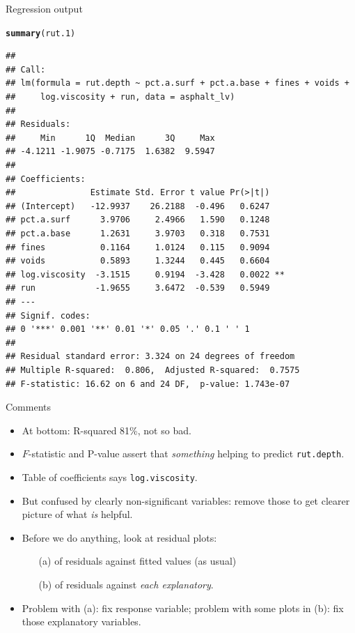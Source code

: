 \documentclass[unknownkeysallowed]{beamer}\usepackage[]{graphicx}\usepackage[]{color}
\makeatletter
\newcommand{\hlstd}[1]{\textcolor[rgb]{0.345,0.345,0.345}{#1}}%
\newcommand{\hlkwd}[1]{\textcolor[rgb]{0.737,0.353,0.396}{\textbf{#1}}}%
\newenvironment{kframe}{%
 \def\at@end@of@kframe{}%
 \ifinner\ifhmode%
  \def\at@end@of@kframe{\end{minipage}}%
  \begin{minipage}{\columnwidth}%
 \fi\fi%
 \def\FrameCommand##1{\hskip\@totalleftmargin \hskip-\fboxsep
 \colorbox{shadecolor}{##1}\hskip-\fboxsep
     \hskip-\linewidth \hskip-\@totalleftmargin \hskip\columnwidth}%
 \MakeFramed {\advance\hsize-\width
   \@totalleftmargin\z@ \linewidth\hsize
   \@setminipage}}%
 {\par\unskip\endMakeFramed%
 \at@end@of@kframe}
\newenvironment{knitrout}{}{} %
\makeatother
\begin{document}
\begin{frame}[fragile]{Regression output}

\begin{knitrout}\scriptsize
{}\color{fgcolor}\begin{kframe}
\begin{alltt}
\hlkwd{summary}\hlstd{(rut.1)}
\end{alltt}
\begin{verbatim}
## 
## Call:
## lm(formula = rut.depth ~ pct.a.surf + pct.a.base + fines + voids + 
##     log.viscosity + run, data = asphalt_lv)
## 
## Residuals:
##     Min      1Q  Median      3Q     Max 
## -4.1211 -1.9075 -0.7175  1.6382  9.5947 
## 
## Coefficients:
##               Estimate Std. Error t value Pr(>|t|)   
## (Intercept)   -12.9937    26.2188  -0.496   0.6247   
## pct.a.surf      3.9706     2.4966   1.590   0.1248   
## pct.a.base      1.2631     3.9703   0.318   0.7531   
## fines           0.1164     1.0124   0.115   0.9094   
## voids           0.5893     1.3244   0.445   0.6604   
## log.viscosity  -3.1515     0.9194  -3.428   0.0022 **
## run            -1.9655     3.6472  -0.539   0.5949   
## ---
## Signif. codes:  
## 0 '***' 0.001 '**' 0.01 '*' 0.05 '.' 0.1 ' ' 1
## 
## Residual standard error: 3.324 on 24 degrees of freedom
## Multiple R-squared:  0.806,	Adjusted R-squared:  0.7575 
## F-statistic: 16.62 on 6 and 24 DF,  p-value: 1.743e-07
\end{verbatim}
\end{kframe}
\end{knitrout}


\end{frame}

\begin{frame}[fragile]{Comments}

  \begin{itemize}
  \item At bottom: R-squared 81\%, not so bad.
  \item $F$-statistic and P-value assert that \emph{something} helping
    to predict \texttt{rut.depth}.
  \item Table of coefficients says \texttt{log.viscosity}.
  \item But confused by clearly non-significant variables: remove
    those to get clearer picture of what \emph{is} helpful.
  \item Before we do anything, look at residual plots:
    \begin{itemize}
    \item[(a)] of residuals against fitted values (as usual)
    \item[(b)] of residuals against \emph{each explanatory}.
    \end{itemize}
  \item Problem with (a): fix response variable; problem with some
    plots in (b): fix those explanatory variables.
  \end{itemize}

\end{frame}
\end{document}
